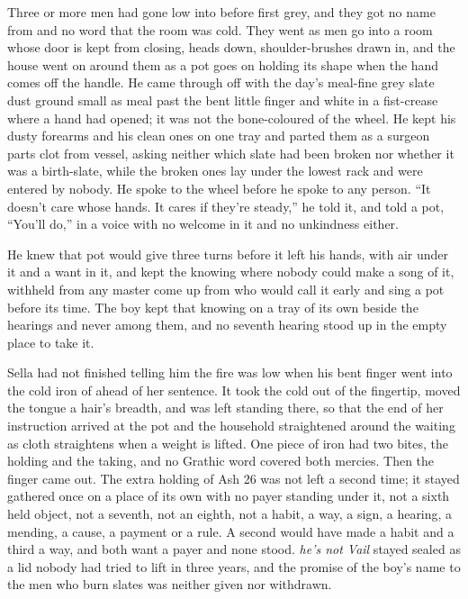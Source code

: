 Three or more men had gone low into  before first grey, and they got no name from  and no word that the room was cold. They went as men go into a room whose door is kept from closing, heads down, shoulder-brushes drawn in, and the house went on around them as a pot goes on holding its shape when the hand comes off the handle. He came through  off  with the day's meal-fine grey slate dust ground small as meal past the bent little finger and white in a fist-crease where a hand had opened; it was not the bone-coloured  of the wheel. He kept his dusty forearms and his clean ones on one tray and parted them as a surgeon parts clot from vessel, asking neither which slate had been broken nor whether it was a birth-slate, while the broken ones lay under the lowest rack and were entered by nobody. He spoke to the wheel before he spoke to any person. “It doesn't care whose hands. It cares if they're steady,” he told it, and told a pot, “You'll do,” in a voice with no welcome in it and no unkindness either.

He knew  that pot would give three turns before it left his hands, with air under it and a want in it, and kept the knowing where nobody could make a song of it, withheld from any master come up from  who would call it early and sing a pot before its time. The boy kept that knowing on a tray of its own beside the hearings and never among them, and no seventh hearing stood up in the empty place to take it.

Sella had not finished telling him the fire was low when his bent finger went into the cold iron of  ahead of her sentence. It took the cold out of the fingertip, moved the tongue a hair's breadth, and was left standing there, so that the end of her instruction arrived at the pot and the household straightened around the waiting as cloth straightens when a weight is lifted. One piece of iron had two bites, the holding and the taking, and no Grathic word covered both mercies. Then the finger came out. The extra holding of Ash 26 was not left a second time; it stayed gathered once on a place of its own with no payer standing under it, not a sixth held object, not a seventh, not an eighth, not a habit, a way, a sign, a hearing, a mending, a cause, a payment or a rule. A second would have made a habit and a third a way, and both want a payer and none stood. \emph{he's not Vail} stayed sealed as a lid nobody had tried to lift in three years, and the promise of the boy's name to the men who burn slates was neither given nor withdrawn.

